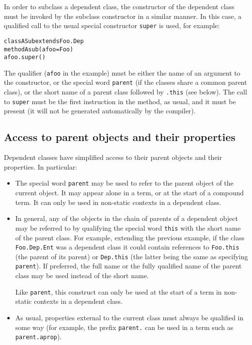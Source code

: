 In order to subclass a dependent class, the constructor of the dependent
class must be invoked by the subclass constructor in a similar manner.
In this case, a qualified call to the usual special
constructor \texttt{super} is used, for example:
\begin{alltt}
class ASub extends Foo.Dep
  method Asub(afoo=Foo)
    afoo.super()
\end{alltt}
 The qualifier (\texttt{afoo} in the example) must be either the name of
an argument to the constructor, or the special word \texttt{parent} (if
the classes share a common parent class), or the short name of a parent
class followed by \texttt{.this} (see below).
The call to \texttt{super} must be the first instruction in the method, as
usual, and it must be present (it will not be generated automatically by
the compiler).
\subsection{Access to parent objects and their properties}
 
Dependent classes have simplified access to their parent objects and
their properties.
In particular:
\begin{itemize}
\item The special word \texttt{parent} may be used to refer to the
parent object of the current object.  It may appear alone in a term, or
at the start of a compound term.
It can only be used in non-static contexts in a dependent class.
\item 
{}
In general, any of the objects in the chain of parents of a dependent
object may be referred to by qualifying the special word \texttt{this}
with the short name of the parent class.
For example, extending the previous example, if the
class \texttt{Foo.Dep.Ent} was a dependent class it could contain
references to \texttt{Foo.this} (the parent of its parent)
or \texttt{Dep.this} (the latter being the same as
specifying \texttt{parent}).  If preferred, the full name or the fully
qualified name of the parent class may be used instead of the short
name.
 
Like \texttt{parent}, this construct can only be used at the start of a
term in non-static contexts in a dependent class.
\item 
{}
As usual, properties external to the current class must always be
qualified in some way (for example, the prefix \texttt{parent.} can be
used in a term such as \texttt{parent.aprop}).
\end{itemize}
